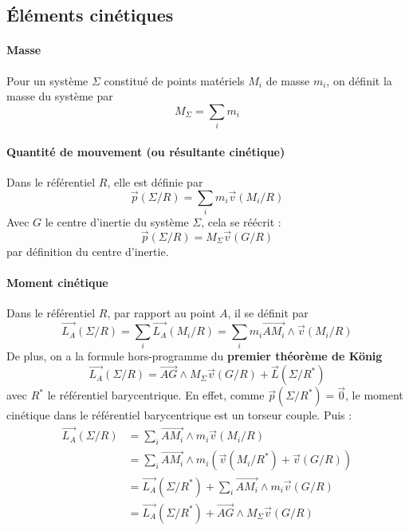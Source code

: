 \documentclass[french]{book}
\theoremstyle{plain}
\theoremstyle{definition}
\theoremstyle{remark}
\newcommand{\st}{^*}
\begin{document}
\subsection{Éléments cinétiques}
\paragraph{Masse} Pour un système $\Sigma$ constitué de points matériels $M_i$ de masse $m_i$, on définit la masse du système par $$M_\Sigma=\sum_i m_i$$
\paragraph{Quantité de mouvement (ou résultante cinétique)} Dans le référentiel $R$, elle est définie par $$\overrightarrow{p}(\Sigma/R)=\sum_im_i\overrightarrow{v}(M_i/R)$$ Avec $G$ le centre d'inertie du système $\Sigma$, cela se réécrit : $$\overrightarrow{p}(\Sigma/R)=M_\Sigma\overrightarrow{v}(G/R)$$ par définition du centre d'inertie.
\paragraph{Moment cinétique}Dans le référentiel $R$, par rapport au point $A$, il se définit par $$\overrightarrow{L_A}(\Sigma/R)=\sum_i\overrightarrow{L_A}(M_i/R)=\sum_i m_i\overrightarrow{AM_i}\wedge\overrightarrow{v}(M_i/R)$$ De plus, on a la formule hors-programme du \textbf{premier théorème de König} $$\overrightarrow{L_A}(\Sigma/R)=\overrightarrow{AG}\wedge M_\Sigma\overrightarrow{v}(G/R)+\overrightarrow{L}(\Sigma/R\st)$$ avec $R\st$ le référentiel barycentrique. En effet, comme $\overrightarrow{p}(\Sigma/R\st)=\overrightarrow{0}$, le moment cinétique dans le référentiel barycentrique est un torseur couple. Puis : 
\begin{align*}
	\overrightarrow{L_A}(\Sigma/R)&=\sum_i\overrightarrow{AM_i}\wedge m_i\overrightarrow{v}(M_i/R) \\
	&=\sum_i\overrightarrow{AM_i}\wedge m_i\left(\overrightarrow{v}(M_i/R\st)+\overrightarrow{v}(G/R)\right) \\
	&=\overrightarrow{L_A}(\Sigma/R\st)+\sum_i\overrightarrow{AM_i}\wedge m_i\overrightarrow{v}(G/R) \\
	&=\overrightarrow{L_A}(\Sigma/R\st)+\overrightarrow{AG}\wedge M_\Sigma\overrightarrow{v}(G/R) \\
\end{align*}
\end{document}
